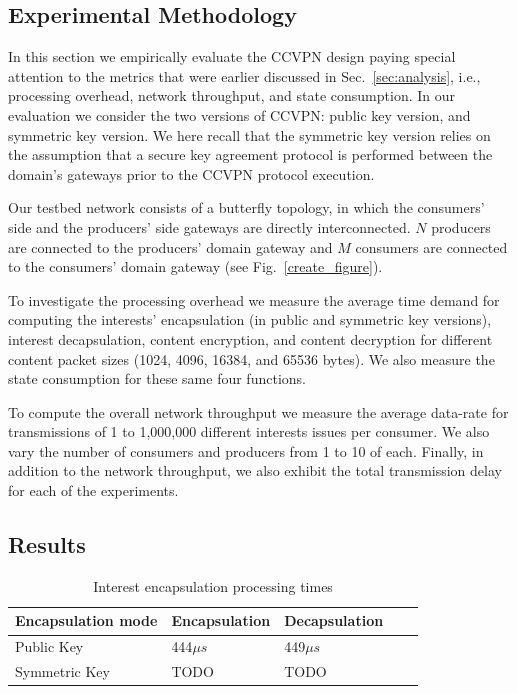 \documentclass[conference,letterpaper,10pt]{IEEEtran}
\begin{document}
\subsection{Experimental Methodology}

In this section we empirically evaluate the CCVPN design paying special attention to the metrics that were earlier discussed in Sec.~\ref{sec:analysis}, i.e., processing overhead, network throughput, and state consumption. In our evaluation we consider the two versions of CCVPN: public key version, and symmetric key version. We here recall that the symmetric key version relies on the assumption that a secure key agreement protocol is performed between the domain's gateways prior to the CCVPN protocol execution.

Our testbed network consists of a butterfly topology, in which the consumers' side and the producers' side gateways are directly interconnected. $N$ producers are connected to the producers' domain gateway and $M$ consumers are connected to the consumers' domain gateway (see Fig.~\ref{create_figure}).

To investigate the processing overhead we measure the average time demand for computing the interests' encapsulation (in public and symmetric key versions), interest decapsulation, content encryption, and content decryption for different content packet sizes (1024, 4096, 16384, and 65536 bytes). We also measure the state consumption for these same four functions.

To compute the overall network throughput we measure the average data-rate for transmissions of 1 to 1,000,000 different interests issues per consumer. We also vary the number of consumers and producers from 1 to 10 of each. Finally, in addition to the network throughput, we also exhibit the total transmission delay for each of the experiments.

\subsection{Results}

\begin{table}[!h]
\centering
\caption{Interest encapsulation processing times}
\label{my-label}
\begin{tabular}{|l|l|l|l|l|}
\hline
Encapsulation mode   & Encapsulation & Decapsulation \\ \hline
Public Key  & 444$\mu s$           & 449$\mu s$           \\ \hline \cline{4-5} 
Symmetric Key & TODO          & TODO          \\ \hline
\end{tabular}
\end{table}
\end{document}
